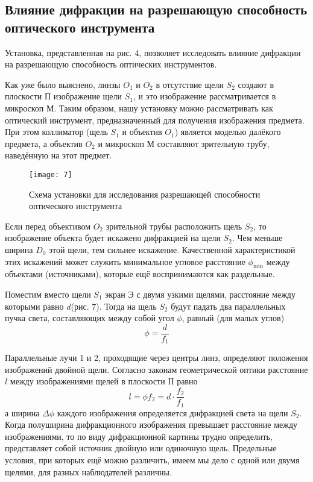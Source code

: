 \documentclass[a4paper, 12pt]{article}
\begin{document}
\subsection*{Влияние дифракции на разрешающую способность
оптического инструмента}
Установка, представленная на рис. 4, позволяет исследовать влияние
дифракции на разрешающую способность оптических инструментов.

Как уже было выяснено, линзы $O_1$ и $O_2$ в отсутствие щели $S_2$ создают в
плоскости П изображение щели $S_1$, и это изображение рассматривается в
микроскоп М. Таким образом, нашу установку можно рассматривать как
оптический инструмент, предназначенный для получения изображения
предмета. При этом коллиматор (щель $S_1$ и объектив $O_1$) является моделью
далёкого предмета, а объектив $O_2$ и микроскоп М составляют зрительную
трубу, наведённую на этот предмет.

\begin{figure}[H]
    \texttt{[image: 7]} 
    \caption{Схема установки для исследования разрешающей способности
    оптического инструмента}
\end{figure}

Если перед объективом $O_2$ зрительной трубы расположить щель $S_2$, то
изображение объекта будет искажено дифракцией на щели $S_2$. Чем меньше
ширина $D_0$ этой щели, тем сильнее искажение. Качественной
характеристикой этих искажений может служить минимальное угловое
расстояние $\phi_{\text{min}}$ между объектами (источниками), которые ещё
воспринимаются как раздельные.


Поместим вместо щели $S_1$ экран Э с двумя узкими щелями, расстояние
между которыми равно $d$(рис. 7). Тогда на щель $S_2$ будут падать два 
параллельных пучка света, составляющих между собой угол $\phi$, равный (для малых углов)
\begin{equation}
    \phi = \frac{d}{f_1}
\end{equation}

Параллельные лучи 1 и 2, проходящие через центры линз, определяют
положения изображений двойной щели. Согласно законам геометрической
оптики расстояние $l$ между изображениями щелей в плоскости П равно
\begin{equation}
    l = \phi f_2 = d \cdot \frac{f_2}{f_1}
\end{equation}
а ширина $\Delta \phi$ каждого изображения определяется дифракцией света на щели
$S_2$. Когда полуширина дифракционного изображения превышает расстояние
между изображениями, то по виду дифракционной картины трудно
определить, представляет собой источник двойную или одиночную щель.
Предельные условия, при которых ещё можно различить, имеем мы дело с
одной или двумя щелями, для разных наблюдателей различны.
\end{document}
